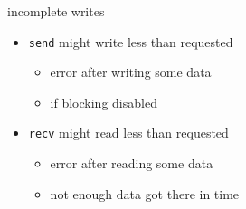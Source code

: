 \begin{frame}{incomplete writes}
\begin{itemize}
    \item \texttt{send} might write less than requested
        \begin{itemize}
        \item error after writing some data
        \item if blocking disabled
        \end{itemize}
    \item \texttt{recv} might read less than requested
        \begin{itemize}
        \item error after reading some data
        \item not enough data got there in time
        \end{itemize}
\end{itemize}
\end{frame}
